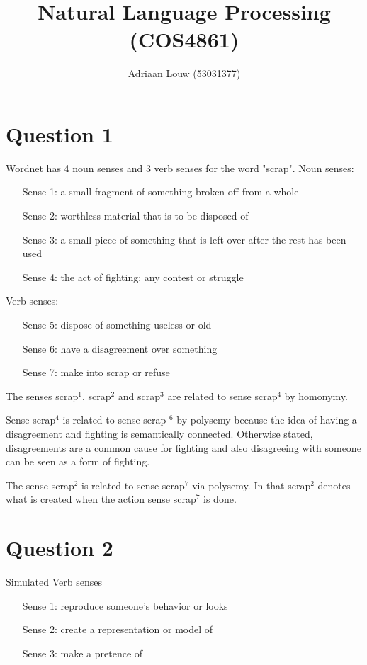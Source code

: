 \documentclass[10pt,a4paper]{article}
\title{Natural Language Processing (COS4861)}
\author{Adriaan Louw (53031377)}
\begin{document}
\maketitle

\section{Question 1}

Wordnet has 4 noun senses and 3 verb senses for the word "scrap". Noun senses:
\begin{enumerate}
\item[Sense 1:] a small fragment of something broken off from a whole
\item[Sense 2:] worthless material that is to be disposed of
\item[Sense 3:] a small piece of something that is left over after the rest has been used
\item[Sense 4:] the act of fighting; any contest or struggle
\end{enumerate}

Verb senses:
\begin{enumerate}
\item[Sense 5:] dispose of something useless or old
\item[Sense 6:] have a disagreement over something
\item[Sense 7:] make into scrap or refuse
\end{enumerate}

The senses scrap$^1$, scrap$^2$ and scrap$^3$ are related to sense scrap$^4$ by homonymy. 

Sense scrap$^4$ is related to sense scrap $^6$ by polysemy because the idea of having a disagreement and fighting is semantically connected. Otherwise stated, disagreements are a common cause for fighting and also disagreeing with someone can be seen as a form of fighting. 

The sense scrap$^2$ is related to sense scrap$^7$ via polysemy. In that scrap$^2$ denotes what is created when the action sense scrap$^7$ is done.

\section{Question 2}

Simulated Verb senses
\begin{enumerate}
\item[Sense 1:] reproduce someone's behavior or looks
\item[Sense 2:] create a representation or model of
\item[Sense 3:] make a pretence of
\end{enumerate}
\end{document}
